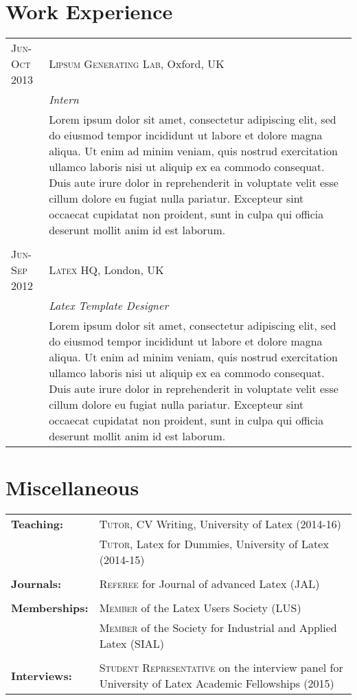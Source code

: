 \documentclass[a4paper,10pt]{article}
\begin{document}
\section{Work Experience}
\begin{tabular}{R{3.1cm}|p{13cm}}
%
 \textsc{Jun-Oct 2013} 		& \textsc{Lipsum Generating Lab}, Oxford, UK \\ 
 							& \emph{Intern} \\
 							& \footnotesize{Lorem ipsum dolor sit amet, consectetur adipiscing elit, sed do eiusmod tempor incididunt ut labore et dolore magna aliqua. Ut enim ad minim veniam, quis nostrud exercitation ullamco laboris nisi ut aliquip ex ea commodo consequat. Duis aute irure dolor in reprehenderit in voluptate velit esse cillum dolore eu fugiat nulla pariatur. Excepteur sint occaecat cupidatat non proident, sunt in culpa qui officia deserunt mollit anim id est laborum.} \\ 
%
  \\
 \textsc{Jun-Sep 2012} 		& \textsc{Latex HQ}, London, UK \\
 							& \emph{Latex Template Designer}\\
 							& \footnotesize{Lorem ipsum dolor sit amet, consectetur adipiscing elit, sed do eiusmod tempor incididunt ut labore et dolore magna aliqua. Ut enim ad minim veniam, quis nostrud exercitation ullamco laboris nisi ut aliquip ex ea commodo consequat. Duis aute irure dolor in reprehenderit in voluptate velit esse cillum dolore eu fugiat nulla pariatur. Excepteur sint occaecat cupidatat non proident, sunt in culpa qui officia deserunt mollit anim id est laborum.}\\ 
%
\end{tabular}



\section{Miscellaneous}

\begin{tabular}{R{3.1cm}p{13cm}}
%
\textbf{Teaching:} 		& \textsc{Tutor}, CV Writing, University of Latex (2014-16)\\
						& \textsc{Tutor}, Latex for Dummies, University of Latex (2014-15) \\
						& \\
%
\textbf{Journals:} 		& \textsc{Referee} for Journal of advanced Latex (JAL) \\
						& \\
%
\textbf{Memberships:} 	& \textsc{Member} of the Latex Users Society (LUS) \\
						& \textsc{Member} of the Society for Industrial and Applied Latex (SIAL) \\ 
						& \\
%
\textbf{Interviews:} & \textsc{Student Representative} on the interview panel for University of Latex Academic Fellowships (2015) \\
%
\end{tabular}
\end{document}
